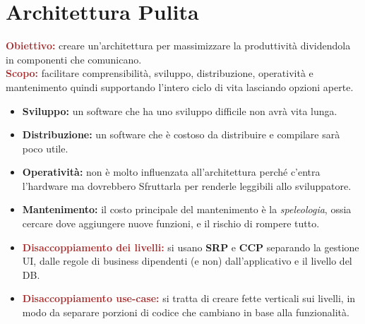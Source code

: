 \chapter{Architettura Pulita}
\begin{boxDef}
\textbf{\textcolor{brown}{Obiettivo:}} creare un'architettura per massimizzare la produttività dividendola in componenti che comunicano. \\
\textbf{\textcolor{brown}{Scopo:}} facilitare comprensibilità, sviluppo, distribuzione, operatività e mantenimento quindi supportando l'intero ciclo di vita lasciando opzioni aperte.

\begin{itemize}
    \item \textbf{Sviluppo:} un software che ha uno sviluppo difficile non avrà vita lunga.
    \item \textbf{Distribuzione:} un software che è costoso da distribuire e compilare sarà poco utile.
    \item \textbf{Operatività:} non è molto influenzata all'architettura perché c'entra l'hardware ma dovrebbero Sfruttarla per renderle leggibili allo sviluppatore.
    \item \textbf{Mantenimento:} il costo principale del mantenimento è la \textit{speleologia}, ossia cercare dove aggiungere nuove funzioni, e il rischio di rompere tutto.
\end{itemize}
\end{boxDef}
\begin{itemize}
    \item \textbf{\textcolor{brown}{Disaccoppiamento dei livelli:}} si usano \textbf{SRP} e \textbf{CCP} separando la gestione UI, dalle regole di business dipendenti (e non) dall'applicativo e il livello del DB.
    \item \textbf{\textcolor{brown}{Disaccoppiamento use-case:}} si tratta di creare fette verticali sui livelli, in modo da separare porzioni di codice che cambiano in base alla funzionalità.
\end{itemize}

